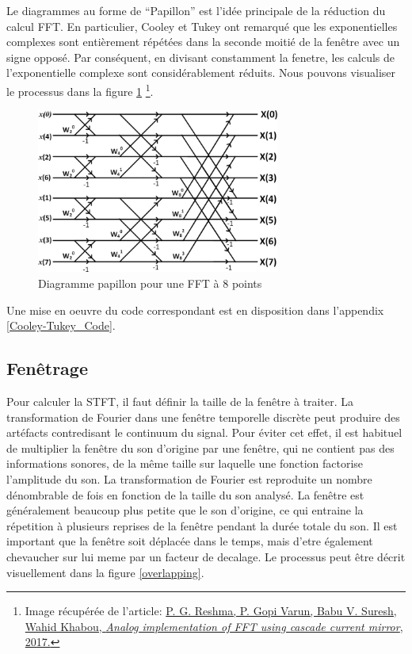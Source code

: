 Le diagrammes au forme de “Papillon” est l'idée principale de la réduction du calcul FFT. En particulier, Cooley et Tukey ont remarqué que les exponentielles complexes sont entièrement répétées dans la seconde moitié de la fenêtre avec un signe opposé. Par conséquent, en divisant constamment la fenetre, les calculs de l’exponentielle complexe sont considérablement réduits. Nous pouvons visualiser le processus dans la figure \ref{Butterfly} \footnote{Image récupérée de l'article: \href{https://www.researchgate.net/figure/Radix-2-butterfly-diagram-for-8- point-FFT_fig1_312460770}{P. G. Reshma, P. Gopi Varun, Babu V. Suresh, Wahid Khabou, \textit{Analog implementation of FFT using cascade current mirror}, 2017.} \nocite{FFTmirror}}.

    \begin{figure}
        \centering
        \includegraphics[width = 8cm]{Graphs/Butterfly_8-point-FFT.png}
        \caption{Diagramme papillon pour une FFT à 8 points}
        \label{Butterfly}
    \end{figure}

Une mise en oeuvre du code correspondant est en disposition dans l'appendix \ref{Cooley-Tukey_Code}.

\subsection{Fenêtrage}

Pour calculer la STFT, il faut définir la taille de la fenêtre à traiter. La transformation de Fourier dans une fenêtre temporelle discrète peut produire des artéfacts contredisant le continuum du signal. Pour éviter cet effet, il est habituel de multiplier la fenêtre du son d'origine par une fenêtre, qui ne contient pas des informations sonores, de la même taille sur laquelle une fonction factorise l'amplitude du son. La transformation de Fourier est reproduite un nombre dénombrable de fois en fonction de la taille du son analysé. La fenêtre est généralement beaucoup plus petite que le son d'origine, ce qui entraine la répetition à plusieurs reprises de la fenêtre pendant la durée totale du son. Il est important que la fenêtre soit déplacée dans le temps, mais d'etre également chevaucher sur lui meme par un facteur de decalage. Le processus peut être décrit visuellement dans la figure \ref{overlapping}.

